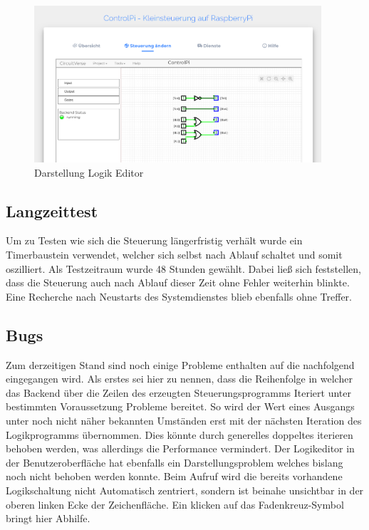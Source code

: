  \begin{figure}[H]
	\begin{center}
		\includegraphics[width=0.95\textwidth]{./images/FrontendAendern.png}
		\caption{Darstellung Logik Editor}
		\label{img:FrontendAenderung}
	\end{center} 
\end{figure}	

\subsection{Langzeittest}
Um zu Testen wie sich die Steuerung längerfristig verhält wurde ein Timerbaustein verwendet, welcher sich selbst nach Ablauf schaltet und somit oszilliert. Als Testzeitraum wurde 48 Stunden gewählt. Dabei ließ sich feststellen, dass die Steuerung auch nach Ablauf dieser Zeit ohne Fehler weiterhin blinkte. Eine Recherche nach Neustarts des Systemdienstes blieb ebenfalls ohne Treffer.    

 \subsection{Bugs}
 Zum derzeitigen Stand sind noch einige Probleme enthalten auf die nachfolgend eingegangen wird. Als erstes sei hier zu nennen, dass die Reihenfolge in welcher das Backend über die Zeilen des erzeugten Steuerungsprogramms Iteriert unter bestimmten Voraussetzung Probleme bereitet. So wird der Wert eines Ausgangs unter noch nicht näher bekannten Umständen erst mit der nächsten Iteration des Logikprogramms übernommen. Dies könnte durch generelles doppeltes iterieren behoben werden, was allerdings die Performance vermindert. Der Logikeditor in der Benutzeroberfläche hat ebenfalls ein Darstellungsproblem welches bislang noch nicht behoben werden konnte. Beim Aufruf wird die bereits vorhandene Logikschaltung nicht Automatisch zentriert, sondern ist beinahe unsichtbar in der oberen linken Ecke der Zeichenfläche. Ein klicken auf das Fadenkreuz-Symbol bringt hier Abhilfe.  
 
